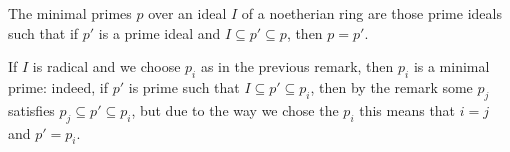The minimal primes $p$ over an ideal $I$ of a noetherian ring are those prime
ideals such that if $p'$ is a prime ideal and $I \subseteq p' \subseteq p$,
then $p = p'$.

If $I$ is radical and we choose $p_i$ as in the previous remark, then $p_i$ is
a minimal prime: indeed, if $p'$ is prime such that $I \subseteq p' \subseteq p_i$,
then by the remark some $p_j$ satisfies $p_j \subseteq p' \subseteq p_i$, but
due to the way we chose the $p_i$ this means that $i = j$ and $p' = p_i$.
